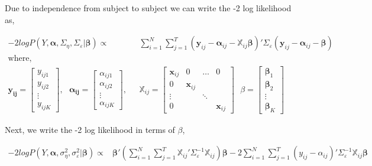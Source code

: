 \documentclass[
]{article}
\begin{document}
Due to independence from subject to subject we can write the -2 log likelihood as,

\begin{equation*}
\begin{aligned}
-2logP(Y, \boldsymbol{\alpha}, \Sigma_\eta, \Sigma_\varepsilon|\boldsymbol{\beta}) \propto & \sum^N_{i=1}\sum^T_{j=1} (\boldsymbol{y}_{ij} - \boldsymbol{\alpha}_{ij} - \boldsymbol{ \mathbb{X}}_{ij}\boldsymbol{\beta})' \Sigma_\varepsilon(\boldsymbol{y}_{ij} - \boldsymbol{\alpha}_{ij} - \boldsymbol{\beta})\\
\text{where,}\\
\boldsymbol{y_{ij}} = \begin{bmatrix}y_{ij1}\\y_{ij2}\\ \vdots \\ y_{ijK}\end{bmatrix}, \ \ \
\boldsymbol{\alpha_{ij}} = \begin{bmatrix}\alpha_{ij1}\\\alpha_{ij2}\\ \vdots \\ \alpha_{ijK}\end{bmatrix}, \ \ \ &
\boldsymbol{ \mathbb{X}}_{ij} = \begin{bmatrix}\boldsymbol{x}_{ij} & 0 & \dots & 0 \\ 0 & \boldsymbol{x}_{ij} \\ \vdots & & \ddots \\
0 & & & \boldsymbol{x}_{ij}\end{bmatrix} \ \ \
\beta = \begin{bmatrix}\boldsymbol{\beta}_1\\ \boldsymbol{\beta}_2 \\ \vdots \\ \boldsymbol{\beta}_K\end{bmatrix}
\end{aligned}
\end{equation*}

Next, we write the -2 log likelihood in terms of \(\beta\),

\begin{equation*}
\begin{aligned}
-2logP(Y, \boldsymbol{\alpha}, \sigma^2_\eta, \sigma^2_\varepsilon|\boldsymbol{\beta}) 
\propto & \boldsymbol{\beta}'(\sum^N_{i=1}\sum^T_{j=1}\boldsymbol{ \mathbb{X}}_{ij}'\Sigma_\varepsilon^{-1}\boldsymbol{ \mathbb{X}}_{ij})\boldsymbol{\beta} -2\sum^N_{i=1}\sum^T_{j=1}(y_{ij} - \alpha_{ij})'\Sigma_\varepsilon^{-1}\boldsymbol{ \mathbb{X}}_{ij}\boldsymbol{\beta} 
\end{aligned}
\end{equation*}
\end{document}
